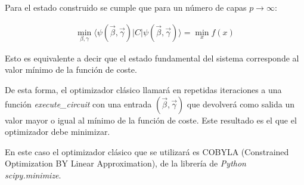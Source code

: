 Para el estado construido se cumple que para un número de capas \(p \rightarrow \infty\):

\begin{align*}
  \min_{\beta, \gamma} \langle \psi(\vec{\beta}, \vec{\gamma}) \rvert C \lvert \psi(\vec{\beta}, \vec{\gamma}) \rangle = \min_{x} f(x)
\end{align*}

Esto es equivalente a decir que el estado fundamental del sistema corresponde al valor mínimo de la función de coste.  %

De esta forma, el optimizador clásico llamará en repetidas iteraciones a una función \textit{execute\_circuit} con una entrada \((\vec{\beta}, \vec{\gamma})\) que devolverá como salida un valor mayor o igual al mínimo de la función de coste. Este resultado es el que el optimizador debe minimizar.

En este caso el optimizador clásico que se utilizará es COBYLA (Constrained Optimization BY Linear Approximation), de la librería de \textit{Python} \textit{scipy.minimize}.  %

